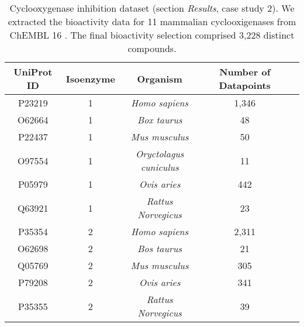 \begin{table}[htb!]
\singlespacing
\centering
\begin{tabulary}{1\textwidth}{CCCCC}
\hline
UniProt ID&Isoenzyme&Organism&Number of Datapoints \\
\hline
P23219&1&{\it Homo sapiens}&1,346\\
O62664&1&{\it Box taurus}&48\\%
P22437&1&{\it Mus musculus}&50\\%
O97554&1&{\it Oryctolagus cuniculus}&11\\%
P05979&1&{\it Ovis aries}&442\\%
Q63921&1&{\it Rattus Norvegicus}&23\\ %
P35354&2&{\it Homo sapiens}&2,311\\ %
O62698&2&{\it Bos taurus}&21\\ %
Q05769&2&{\it Mus musculus}&305\\ %
P79208&2&{\it Ovis aries}&341 \\ %
P35355&2&{\it Rattus Norvegicus}&39 \\ %
\hline
\end{tabulary}
\caption{Cyclooxygenase inhibition dataset (section {\it Results}, case study 2).
We extracted the bioactivity data for 11 mammalian cyclooxigenases from ChEMBL 16 \citep{cehmbl}.
The final bioactivity selection comprised 3,228 distinct compounds.
}
\label{}
\end{table}


